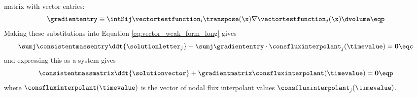 matrix with vector entries:
\begin{equation}
  \gradiententry \equiv
    \intSij\vectortestfunction_i\transpose(\x)
      \nabla\vectortestfunction_j(\x) \dvolume
  \eqp
\end{equation}
Making these substitutions into Equation \eqref{eq:vector_weak_form_long} gives
\begin{equation}\label{eq:vector_weak_form}
   \sumj\consistentmassentry\ddt{\solutionletter_j}
     + \sumj\gradiententry\cdot\consfluxinterpolant_j(\timevalue)
     = \mathbf{0} \eqc
\end{equation}
and expressing this as a system gives
\begin{equation}
  \consistentmassmatrix\ddt{\solutionvector}
    + \gradientmatrix\consfluxinterpolant(\timevalue) = \mathbf{0}
  \eqp
\end{equation}
where $\consfluxinterpolant(\timevalue)$ is the vector of nodal flux interpolant values
$\consfluxinterpolant_j(\timevalue)$.
